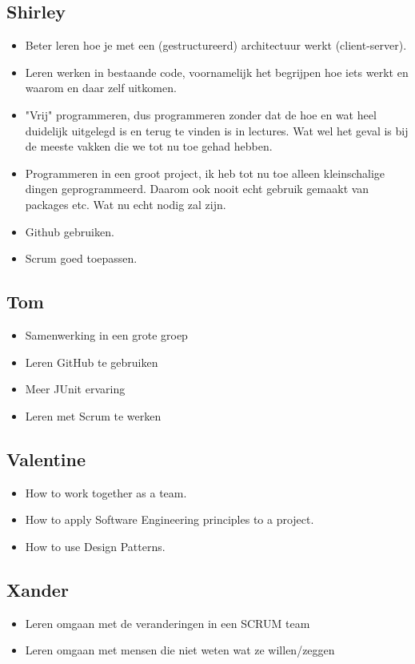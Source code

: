\documentclass{article}
\begin{document}
\subsection*{Shirley}
 	\begin{itemize}
 	\item Beter leren hoe je met een (gestructureerd) architectuur werkt (client-server).
 	\item Leren werken in bestaande code, voornamelijk het begrijpen hoe iets werkt en waarom en daar zelf uitkomen.
 	\item "Vrij" programmeren, dus programmeren zonder dat de hoe en wat heel duidelijk uitgelegd is en terug te vinden is in lectures.
 	Wat wel het geval is bij de meeste vakken die we tot nu toe gehad hebben.
 	\item Programmeren in een groot project, ik heb tot nu toe alleen kleinschalige dingen geprogrammeerd. 
 	Daarom ook nooit echt gebruik gemaakt van packages etc. Wat nu echt nodig zal zijn.
 	\item Github gebruiken.
 	\item Scrum goed toepassen.
 \end{itemize}

\subsection*{Tom}
\begin{itemize}
	\item Samenwerking in een grote groep
	\item Leren GitHub te gebruiken
	\item Meer JUnit ervaring
	\item Leren met Scrum te werken
\end{itemize}
\subsection*{Valentine}
\begin{itemize}
	\item How to work together as a team.
	\item How to apply Software Engineering principles to a project.
	\item How to use Design Patterns.
\end{itemize}

\subsection*{Xander}
\begin{itemize}
	\item Leren omgaan met de veranderingen in een SCRUM team
	\item Leren omgaan met mensen die niet weten wat ze willen/zeggen
\end{itemize}
\end{document}
